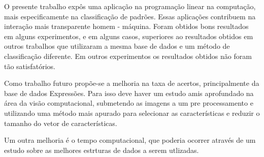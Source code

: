 O presente trabalho expôs uma aplicação na programação linear na computação, mais especificamente na classificação de padrões. Essas aplicações contribuem na interação mais transparente homem - máquina.
Foram obtidos bons resultados em alguns experimentos, e em alguns casos, superiores ao resultados obtidos em outros trabalhos que utilizaram a mesma base de dados e um método de classificação diferente. Em outros experimentos os resultados obtidos não foram tão satisfatórios.

Como trabalho futuro propõe-se a melhoria na taxa de acertos, principalmente da base de dados Expressões. Para isso deve haver um estudo amis aprofundado na área da visão computacional, submetendo as imagens a um pre processamento e utilizando uma método mais apurado para selecionar as características e reduzir o tamanho do vetor de características.

Um outra melhoria é o tempo computacional, que poderia ocorrer através de um estudo sobre as melhores estrturas de dados a serem utlizadas.   
